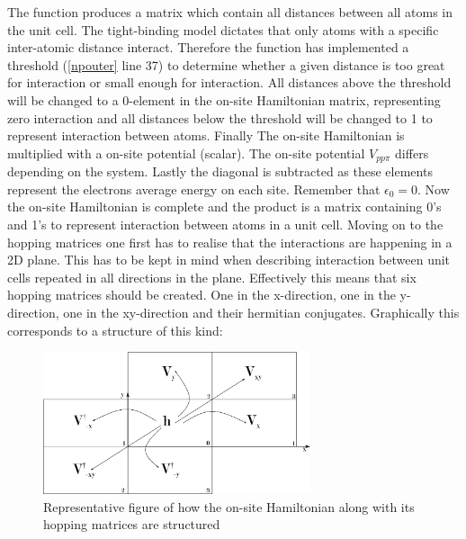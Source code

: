 The function produces a matrix which contain all distances between all atoms in the unit cell. The tight-binding model dictates that only atoms with a specific inter-atomic distance interact. Therefore the function has implemented a threshold (\cref{npouter} line 37) to determine whether a given distance is too great for interaction or small enough for interaction. All distances above the threshold will be changed to a 0-element in the on-site Hamiltonian matrix, representing zero interaction and all distances below the threshold will be changed to 1 to represent interaction between atoms. Finally The on-site Hamiltonian is multiplied with a on-site potential (scalar). The on-site potential \(V_{pp\pi}\) differs depending on the system. Lastly the diagonal is subtracted as these elements represent the electrons average energy on each site. Remember that \(\epsilon_0 = 0\). Now the on-site Hamiltonian is complete and the product is a matrix containing 0's and 1's to represent interaction between atoms in a unit cell. \newline
Moving on to the hopping matrices one first has to realise that the interactions are happening in a 2D plane. This has to be kept in mind when describing interaction between unit cells repeated in all directions in the plane. Effectively this means that six hopping matrices should be created. One in the x-direction, one in the y-direction, one in the xy-direction and their hermitian conjugates. Graphically this corresponds to a structure of this kind:
\begin{figure}[H]
	\centering
	\includegraphics[width = 0.7\textwidth]{Figures/repfig.eps}
	\caption{Representative figure of how the on-site Hamiltonian along with its hopping matrices are structured}
	\label{repfig}
\end{figure}
